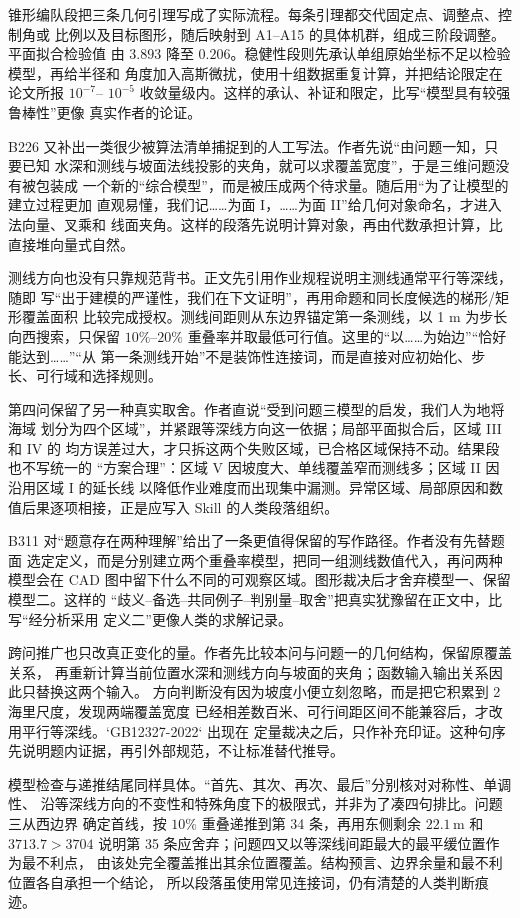 锥形编队段把三条几何引理写成了实际流程。每条引理都交代固定点、调整点、控制角或
比例以及目标图形，随后映射到 A1--A15 的具体机群，组成三阶段调整。平面拟合检验值
由 $3.893$ 降至 $0.206$。稳健性段则先承认单组原始坐标不足以检验模型，再给半径和
角度加入高斯微扰，使用十组数据重复计算，并把结论限定在论文所报 $10^{-7}$--
$10^{-5}$ 收敛量级内。这样的承认、补证和限定，比写“模型具有较强鲁棒性”更像
真实作者的论证。

B226 又补出一类很少被算法清单捕捉到的人工写法。作者先说“由问题一知，只要已知
水深和测线与坡面法线投影的夹角，就可以求覆盖宽度”，于是三维问题没有被包装成
一个新的“综合模型”，而是被压成两个待求量。随后用“为了让模型的建立过程更加
直观易懂，我们记……为面 I，……为面 II”给几何对象命名，才进入法向量、叉乘和
线面夹角。这样的段落先说明计算对象，再由代数承担计算，比直接堆向量式自然。

测线方向也没有只靠规范背书。正文先引用作业规程说明主测线通常平行等深线，随即
写“出于建模的严谨性，我们在下文证明”，再用命题和同长度候选的梯形/矩形覆盖面积
比较完成授权。测线间距则从东边界锚定第一条测线，以 1 m 为步长向西搜索，只保留
$10\%$--$20\%$ 重叠率并取最低可行值。这里的“以……为始边”“恰好能达到……”“从
第一条测线开始”不是装饰性连接词，而是直接对应初始化、步长、可行域和选择规则。

第四问保留了另一种真实取舍。作者直说“受到问题三模型的启发，我们人为地将海域
划分为四个区域”，并紧跟等深线方向这一依据；局部平面拟合后，区域 III 和 IV 的
均方误差过大，才只拆这两个失败区域，已合格区域保持不动。结果段也不写统一的
“方案合理”：区域 V 因坡度大、单线覆盖窄而测线多；区域 II 因沿用区域 I 的延长线
以降低作业难度而出现集中漏测。异常区域、局部原因和数值后果逐项相接，正是应写入
Skill 的人类段落组织。

B311 对“题意存在两种理解”给出了一条更值得保留的写作路径。作者没有先替题面
选定定义，而是分别建立两个重叠率模型，把同一组测线数值代入，再问两种模型会在
CAD 图中留下什么不同的可观察区域。图形裁决后才舍弃模型一、保留模型二。这样的
“歧义--备选--共同例子--判别量--取舍”把真实犹豫留在正文中，比写“经分析采用
定义二”更像人类的求解记录。

跨问推广也只改真正变化的量。作者先比较本问与问题一的几何结构，保留原覆盖关系，
再重新计算当前位置水深和测线方向与坡面的夹角；函数输入输出关系因此只替换这两个输入。
方向判断没有因为坡度小便立刻忽略，而是把它积累到 2 海里尺度，发现两端覆盖宽度
已经相差数百米、可行间距区间不能兼容后，才改用平行等深线。`GB12327-2022` 出现在
定量裁决之后，只作补充印证。这种句序先说明题内证据，再引外部规范，不让标准替代推导。

模型检查与递推结尾同样具体。“首先、其次、再次、最后”分别核对对称性、单调性、
沿等深线方向的不变性和特殊角度下的极限式，并非为了凑四句排比。问题三从西边界
确定首线，按 $10\%$ 重叠递推到第 34 条，再用东侧剩余 $22.1\,\mathrm{m}$ 和
$3713.7>3704$ 说明第 35 条应舍弃；问题四又以等深线间距最大的最平缓位置作为最不利点，
由该处完全覆盖推出其余位置覆盖。结构预言、边界余量和最不利位置各自承担一个结论，
所以段落虽使用常见连接词，仍有清楚的人类判断痕迹。

